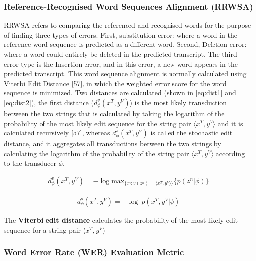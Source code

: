 \documentclass[
  a4paper,
]{article}
\begin{document}
\hypertarget{reference-recognised-word-sequences-alignment-rrwsa}{%
\subsubsection{Reference-Recognised Word Sequences Alignment
(RRWSA)}\label{reference-recognised-word-sequences-alignment-rrwsa}}

RRWSA refers to comparing the referenced and recognised words for the
purpose of finding three types of errors. First, substitution error:
where a word in the reference word sequence is predicted as a different
word. Second, Deletion error: where a word could entirely be deleted in
the predicted transcript. The third error type is the Insertion error,
and in this error, a new word appears in the predicted transcript. This
word sequence alignment is normally calculated using Viterbi Edit
Distance \protect\hyperlink{ref-682181}{{[}57{]}}, in which the weighted
error score for the word sequence is minimized. Two distances are
calculated (shown in \ref{eq:dist1} and \ref{eq:dist2}), the first
distance (\(d_\phi^v(x^T,y^V)\)) is the most likely transduction between
the two strings that is calculated by taking the logarithm of the
probability of the most likely edit sequence for the string pair
\(\langle x^T,y^V\rangle\) and it is calculated recursively
\protect\hyperlink{ref-682181}{{[}57{]}}, whereas \(d_\phi^s(x^T,y^V)\)
is called the stochastic edit distance, and it aggregates all
transductions between the two strings by calculating the logarithm of
the probability of the string pair \(\langle x^T,y^V\rangle\) according
to the transducer \(\phi\).

\begin{align}
\label{eq:dist1}
d_\phi^{v}(x^T, y^V) = -\log \mathrm{max}_{\{ z^n : v(z^n) = \langle x^T, y^V \rangle \}} \{p(z^n|\phi) \}
\end{align}

\begin{align}
\label{eq:dist2}
d_\phi^{s}(x^T, y^V) = -\log  \ p(x^T, y^V|\phi)
\end{align}

The \textbf{Viterbi edit distance} calculates the probability of the
most likely edit sequence for a string pair (\(x^T, y^V\))

\hypertarget{word-error-rate-wer-evaluation-metric}{%
\subsubsection{Word Error Rate (WER) Evaluation
Metric}\label{word-error-rate-wer-evaluation-metric}}
\end{document}
